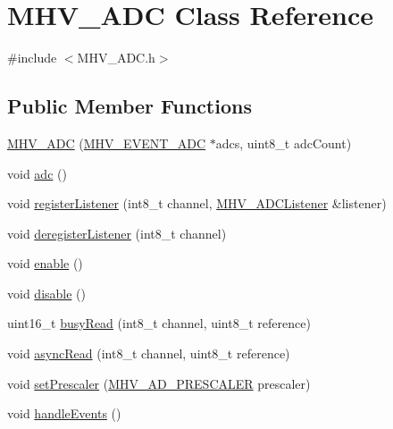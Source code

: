 \hypertarget{class_m_h_v___a_d_c}{
\section{\-M\-H\-V\-\_\-\-A\-D\-C \-Class \-Reference}
\label{class_m_h_v___a_d_c}
}


{\ttfamily \#include $<$\-M\-H\-V\-\_\-\-A\-D\-C.\-h$>$}

\subsection*{\-Public \-Member \-Functions}
\begin{DoxyCompactItemize}
\item 
\hyperlink{class_m_h_v___a_d_c_a99020253bc4e308715108a37ff317471}{\-M\-H\-V\-\_\-\-A\-D\-C} (\hyperlink{_m_h_v___a_d_c_8h_a21c373c52cc2836a0010981c9b63d1f9}{\-M\-H\-V\-\_\-\-E\-V\-E\-N\-T\-\_\-\-A\-D\-C} $\ast$adcs, uint8\-\_\-t adc\-Count)
\item 
void \hyperlink{class_m_h_v___a_d_c_a62548b3bbb7b2e916a5adba15d40723f}{adc} ()
\item 
void \hyperlink{class_m_h_v___a_d_c_a5f851f487355a1a749b1e716d32d2c14}{register\-Listener} (int8\-\_\-t channel, \hyperlink{class_m_h_v___a_d_c_listener}{\-M\-H\-V\-\_\-\-A\-D\-C\-Listener} \&listener)
\item 
void \hyperlink{class_m_h_v___a_d_c_a2d954cfe88bf7f67b7344b5356202cb7}{deregister\-Listener} (int8\-\_\-t channel)
\item 
void \hyperlink{class_m_h_v___a_d_c_a5578b8f74a62fbf4207dd10a6d3da4f0}{enable} ()
\item 
void \hyperlink{class_m_h_v___a_d_c_ad7eb5acfd0484c0213dcfb6851de2052}{disable} ()
\item 
uint16\-\_\-t \hyperlink{class_m_h_v___a_d_c_ae466a6a016739a21cf872e230704a56e}{busy\-Read} (int8\-\_\-t channel, uint8\-\_\-t reference)
\item 
void \hyperlink{class_m_h_v___a_d_c_a07e1c2813885be53550ff519470f8d22}{async\-Read} (int8\-\_\-t channel, uint8\-\_\-t reference)
\item 
void \hyperlink{class_m_h_v___a_d_c_a29943f22942857e41e6c060ec7238765}{set\-Prescaler} (\hyperlink{_m_h_v___a_d_8h_a1c5416b19545e0c8422dbe381d6df18f}{\-M\-H\-V\-\_\-\-A\-D\-\_\-\-P\-R\-E\-S\-C\-A\-L\-E\-R} prescaler)
\item 
void \hyperlink{class_m_h_v___a_d_c_a431d2be95d566a7595691a0ecb40ba54}{handle\-Events} ()
\end{DoxyCompactItemize}
